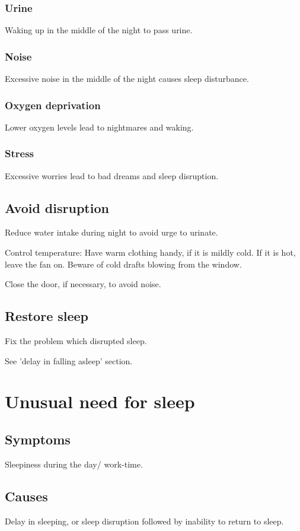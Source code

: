\documentclass[oneside, article]{memoir}
\begin{document}
\subsubsection{Urine}
Waking up in the middle of the night to pass urine.

\subsubsection{Noise}
Excessive noise in the middle of the night causes sleep disturbance.

\subsubsection{Oxygen deprivation}
Lower oxygen levels lead to nightmares and waking.

\subsubsection{Stress}
Excessive worries lead to bad dreams and sleep disruption.



\subsection{Avoid disruption}
Reduce water intake during night to avoid urge to urinate.

Control temperature: Have warm clothing handy, if it is mildly cold. If it is hot, leave the fan on. Beware of cold drafts blowing from the window.

Close the door, if necessary, to avoid noise.

\subsection{Restore sleep}
Fix the problem which disrupted sleep.

See 'delay in falling asleep' section.

\section{Unusual need for sleep}
\subsection{Symptoms}
Sleepiness during the day/ work-time.

\subsection{Causes}
Delay in sleeping, or sleep disruption followed by inability to return to sleep.
\end{document}
